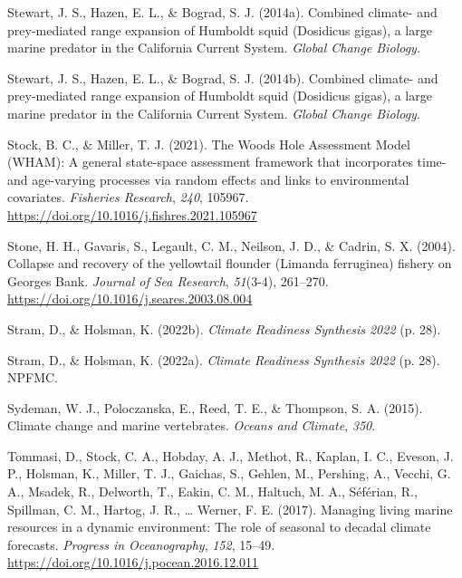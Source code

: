 \documentclass[
  12pt,
]{article}
\newlength{\cslhangindent}
\newenvironment{CSLReferences}[2] %
 {\begin{list}{}{%
  \setlength{\itemindent}{0pt}
  \setlength{\leftmargin}{0pt}
  \setlength{\parsep}{0pt}
  \ifodd #1
   \setlength{\leftmargin}{\cslhangindent}
   \setlength{\itemindent}{-1\cslhangindent}
  \fi
  \setlength{\itemsep}{#2\baselineskip}}}
 {\end{list}}
\begin{document}
\begin{CSLReferences}{1}{2}
Stewart, J. S., Hazen, E. L., \& Bograd, S. J. (2014a). Combined climate{-} and prey{-}mediated range expansion of Humboldt squid (Dosidicus gigas), a large marine predator in the California Current System. \emph{Global Change Biology}.

Stewart, J. S., Hazen, E. L., \& Bograd, S. J. (2014b). Combined climate- and prey-mediated range expansion of {Humboldt} squid ({Dosidicus} gigas), a large marine predator in the {California Current System}. \emph{Global Change Biology}.

Stock, B. C., \& Miller, T. J. (2021). The {Woods Hole Assessment Model} ({WHAM}): {A} general state-space assessment framework that incorporates time- and age-varying processes via random effects and links to environmental covariates. \emph{Fisheries Research}, \emph{240}, 105967. \url{https://doi.org/10.1016/j.fishres.2021.105967}

Stone, H. H., Gavaris, S., Legault, C. M., Neilson, J. D., \& Cadrin, S. X. (2004). Collapse and recovery of the yellowtail flounder (Limanda ferruginea) fishery on Georges Bank. \emph{Journal of Sea Research}, \emph{51}(3-4), 261--270. \url{https://doi.org/10.1016/j.seares.2003.08.004}

Stram, D., \& Holsman, K. (2022b). \emph{Climate Readiness Synthesis 2022} (p. 28).

Stram, D., \& Holsman, K. (2022a). \emph{Climate {Readiness Synthesis} 2022} (p. 28). NPFMC.

Sydeman, W. J., Poloczanska, E., Reed, T. E., \& Thompson, S. A. (2015). Climate change and marine vertebrates. \emph{Oceans and Climate}, \emph{350}.

Tommasi, D., Stock, C. A., Hobday, A. J., Methot, R., Kaplan, I. C., Eveson, J. P., Holsman, K., Miller, T. J., Gaichas, S., Gehlen, M., Pershing, A., Vecchi, G. A., Msadek, R., Delworth, T., Eakin, C. M., Haltuch, M. A., Séférian, R., Spillman, C. M., Hartog, J. R., \ldots{} Werner, F. E. (2017). Managing living marine resources in a dynamic environment: The role of seasonal to decadal climate forecasts. \emph{Progress in Oceanography}, \emph{152}, 15--49. \url{https://doi.org/10.1016/j.pocean.2016.12.011}


\end{CSLReferences}
\end{document}
